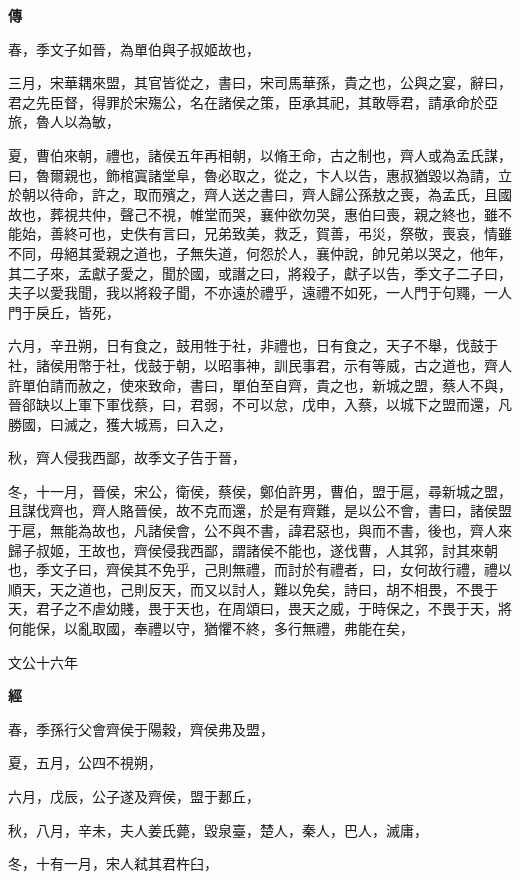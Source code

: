 \documentclass{ctexart}
\begin{document}
\textbf{傳}



春，季文子如晉，為單伯與子叔姬故也，

三月，宋華耦來盟，其官皆從之，書曰，宋司馬華孫，貴之也，公與之宴，辭曰，君之先臣督，得罪於宋殤公，名在諸侯之策，臣承其祀，其敢辱君，請承命於亞旅，魯人以為敏，

夏，曹伯來朝，禮也，諸侯五年再相朝，以脩王命，古之制也，齊人或為孟氏謀，曰，魯爾親也，飾棺寘諸堂阜，魯必取之，從之，卞人以告，惠叔猶毀以為請，立於朝以待命，許之，取而殯之，齊人送之書曰，齊人歸公孫敖之喪，為孟氏，且國故也，葬視共仲，聲己不視，帷堂而哭，襄仲欲勿哭，惠伯曰喪，親之終也，雖不能始，善終可也，史佚有言曰，兄弟致美，救乏，賀善，弔災，祭敬，喪哀，情雖不同，毋絕其愛親之道也，子無失道，何怨於人，襄仲說，帥兄弟以哭之，他年，其二子來，孟獻子愛之，聞於國，或譖之曰，將殺子，獻子以告，季文子二子曰，夫子以愛我聞，我以將殺子聞，不亦遠於禮乎，遠禮不如死，一人門于句鼆，一人門于戾丘，皆死，

六月，辛丑朔，日有食之，鼓用牲于社，非禮也，日有食之，天子不舉，伐鼓于社，諸侯用幣于社，伐鼓于朝，以昭事神，訓民事君，示有等威，古之道也，齊人許單伯請而赦之，使來致命，書曰，單伯至自齊，貴之也，新城之盟，蔡人不與，晉郤缺以上軍下軍伐蔡，曰，君弱，不可以怠，戊申，入蔡，以城下之盟而還，凡勝國，曰滅之，獲大城焉，曰入之，

秋，齊人侵我西鄙，故季文子告于晉，

冬，十一月，晉侯，宋公，衛侯，蔡侯，鄭伯許男，曹伯，盟于扈，尋新城之盟，且謀伐齊也，齊人賂晉侯，故不克而還，於是有齊難，是以公不會，書曰，諸侯盟于扈，無能為故也，凡諸侯會，公不與不書，諱君惡也，與而不書，後也，齊人來歸子叔姬，王故也，齊侯侵我西鄙，謂諸侯不能也，遂伐曹，人其郛，討其來朝也，季文子曰，齊侯其不免乎，己則無禮，而討於有禮者，曰，女何故行禮，禮以順天，天之道也，己則反天，而又以討人，難以免矣，詩曰，胡不相畏，不畏于天，君子之不虐幼賤，畏于天也，在周頌曰，畏天之威，于時保之，不畏于天，將何能保，以亂取國，奉禮以守，猶懼不終，多行無禮，弗能在矣，





文公十六年


\textbf{經}



春，季孫行父會齊侯于陽穀，齊侯弗及盟，

夏，五月，公四不視朔，

六月，戊辰，公子遂及齊侯，盟于郪丘，

秋，八月，辛未，夫人姜氏薨，毀泉臺，楚人，秦人，巴人，滅庸，

冬，十有一月，宋人弒其君杵臼，
\end{document}
